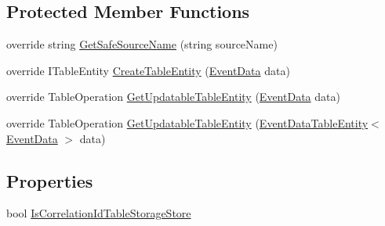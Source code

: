 \subsection*{Protected Member Functions}
\begin{DoxyCompactItemize}
\item 
override string \hyperlink{classCqrs_1_1Azure_1_1BlobStorage_1_1Events_1_1TableStorageEventStore_1_1RawTableStorageEventStore_ab02dd26098d25c2663abdf3da9f57f0f_ab02dd26098d25c2663abdf3da9f57f0f}{Get\+Safe\+Source\+Name} (string source\+Name)
\item 
override I\+Table\+Entity \hyperlink{classCqrs_1_1Azure_1_1BlobStorage_1_1Events_1_1TableStorageEventStore_1_1RawTableStorageEventStore_a916cc6bc33379535690aa0c2e7e90554_a916cc6bc33379535690aa0c2e7e90554}{Create\+Table\+Entity} (\hyperlink{classCqrs_1_1Events_1_1EventData}{Event\+Data} data)
\item 
override Table\+Operation \hyperlink{classCqrs_1_1Azure_1_1BlobStorage_1_1Events_1_1TableStorageEventStore_1_1RawTableStorageEventStore_afa1fdd2a115ebf6e12411f8a9e7029a9_afa1fdd2a115ebf6e12411f8a9e7029a9}{Get\+Updatable\+Table\+Entity} (\hyperlink{classCqrs_1_1Events_1_1EventData}{Event\+Data} data)
\item 
override Table\+Operation \hyperlink{classCqrs_1_1Azure_1_1BlobStorage_1_1Events_1_1TableStorageEventStore_1_1RawTableStorageEventStore_a36cc2b354b0e2dc33a032473e459c8ec_a36cc2b354b0e2dc33a032473e459c8ec}{Get\+Updatable\+Table\+Entity} (\hyperlink{classCqrs_1_1Azure_1_1BlobStorage_1_1EventDataTableEntity}{Event\+Data\+Table\+Entity}$<$ \hyperlink{classCqrs_1_1Events_1_1EventData}{Event\+Data} $>$ data)
\end{DoxyCompactItemize}
\subsection*{Properties}
\begin{DoxyCompactItemize}
\item 
bool \hyperlink{classCqrs_1_1Azure_1_1BlobStorage_1_1Events_1_1TableStorageEventStore_1_1RawTableStorageEventStore_a566f4821980b2ca77f12f88d010beff2_a566f4821980b2ca77f12f88d010beff2}{Is\+Correlation\+Id\+Table\+Storage\+Store}
\end{DoxyCompactItemize}


